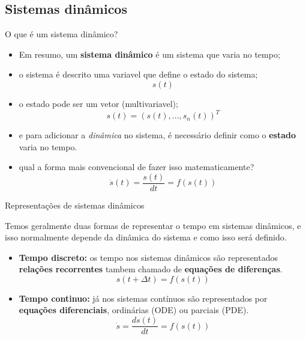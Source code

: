 \documentclass{beamer}
\begin{document}
		\subsection{Sistemas dinâmicos}
		\begin{frame}{O que é um sistema dinâmico?}
			\begin{itemize}[<+->]
				\item Em resumo, um \textbf{sistema dinâmico} é um sistema que varia no tempo;
				\item o sistema é descrito uma variavel que define o estado do sistema;
					\begin{equation}
						s(t)
					\end{equation}
				\item o estado pode ser um vetor (multivariavel);
					\begin{equation}
						s(t)=(s(t),...,s_n(t))^{T}
					\end{equation}
				\item e para adicionar a \emph{dinâmica} no sistema, é necessário definir como o \textbf{estado} varia no tempo.
				\item qual a forma mais convencional de fazer isso matematicamente?
				\begin{equation}
					\dot{s}(t) = \frac{s(t)}{dt} = f(s(t))
				\end{equation}
			\end{itemize}
		\end{frame}
		\begin{frame}{Representações de sistemas dinâmicos}
			\par Temos geralmente duas formas de representar o tempo em sistemas dinâmicos, e isso normalmente depende da dinâmica do sistema e como isso será definido.
			\begin{itemize}[<+->]
				\item \textbf{Tempo discreto:} os tempo nos sistemas dinâmicos são representados \textbf{relações recorrentes} tambem chamado de \textbf{equações de diferenças}.
				\begin{equation}
					s(t+\Delta t) = f(s(t))
				\end{equation}
				\item \textbf{Tempo continuo:} já nos sistemas contínuos são representados por \textbf{equações diferenciais}, ordinárias (ODE) ou parciais (PDE).
				\begin{equation}
					\dot{s} = \frac{ds(t)}{dt} = f(s(t))
				\end{equation}			
			\end{itemize}
		\end{frame}
\end{document}
